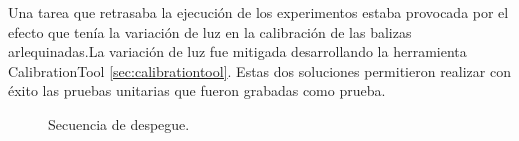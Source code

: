 Una tarea que retrasaba la ejecución de los experimentos estaba provocada por el efecto que tenía la variación de luz en la calibración de las balizas arlequinadas.La variación de luz fue mitigada desarrollando la herramienta CalibrationTool \ref{sec:calibrationtool}. Estas dos soluciones permitieron realizar con éxito las pruebas unitarias que fueron grabadas como prueba.
\begin{figure}[H]
	\begin{center}
		\centering
		\hspace{5mm}
		\hspace{5mm}
		\label{fig:despegueReal}	
	\end{center}
\end{figure}

\begin{figure}[H]
	\begin{center}
		\centering
		\caption{Secuencia de despegue.}
		\label{fig:despegueReal2}	
	\end{center}
\end{figure}
